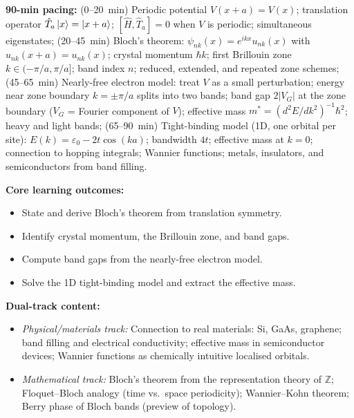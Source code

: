 \documentclass[11pt,a4paper]{article}
\begin{document}
\begin{tcolorbox}[modulebox, title={Module~I.4 / L02: The Simple Bloch Electron}]
\textbf{90-min pacing:} (0--20~min) Periodic potential $V(x+a)=V(x)$; translation operator
$\hat{T}_a\ket{x}=\ket{x+a}$; $[\hat{H},\hat{T}_a]=0$ when $V$ is periodic;
simultaneous eigenstates;
(20--45~min) Bloch's theorem: $\psi_{nk}(x)=e^{ikx}u_{nk}(x)$ with $u_{nk}(x+a)=u_{nk}(x)$;
crystal momentum $\hbar k$; first Brillouin zone $k\in(-\pi/a,\pi/a]$;
band index $n$; reduced, extended, and repeated zone schemes;
(45--65~min) Nearly-free electron model: treat $V$ as a small perturbation;
energy near zone boundary $k=\pm\pi/a$ splits into two bands;
band gap $2|V_G|$ at the zone boundary ($V_G$ = Fourier component of $V$);
effective mass $m^*=(d^2E/dk^2)^{-1}\hbar^2$; heavy and light bands;
(65--90~min) Tight-binding model (1D, one orbital per site):
$E(k)=\varepsilon_0-2t\cos(ka)$; bandwidth $4t$; effective mass at $k=0$;
connection to hopping integrals; Wannier functions;
metals, insulators, and semiconductors from band filling.

\medskip\textbf{Core learning outcomes:}
\begin{itemize}[leftmargin=1.4em,topsep=2pt,itemsep=1pt]
  \item State and derive Bloch's theorem from translation symmetry.
  \item Identify crystal momentum, the Brillouin zone, and band gaps.
  \item Compute band gaps from the nearly-free electron model.
  \item Solve the 1D tight-binding model and extract the effective mass.
\end{itemize}

\medskip\textbf{Dual-track content:}
\begin{itemize}[leftmargin=1.4em,topsep=2pt,itemsep=1pt]
  \item \textit{Physical/materials track:} Connection to real materials: Si, GaAs, graphene;
    band filling and electrical conductivity; effective mass in semiconductor devices;
    Wannier functions as chemically intuitive localised orbitals.
  \item \textit{Mathematical track:} Bloch's theorem from the representation theory of $\mathbb{Z}$;
    Floquet--Bloch analogy (time vs.\ space periodicity); Wannier--Kohn theorem;
    Berry phase of Bloch bands (preview of topology).
\end{itemize}


\end{tcolorbox}
\end{document}
